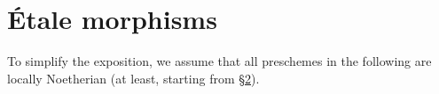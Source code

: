 \chapter{Étale morphisms}
\label{I}

To simplify the exposition, we assume that all preschemes in the following are locally Noetherian (at least, starting from \hyperref[I.2]{\S2}).











